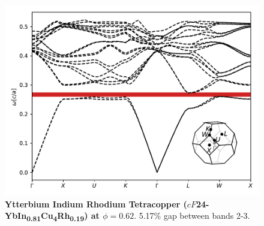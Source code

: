 \documentclass[fleqn,amsmath,amssymb,superscriptaddress, reprint,prl]{revtex4-1}
\begin{document}
\begin{figure}
\includegraphics[width=0.9\linewidth]{workspace/4280fc582e0e1774e4faa8a63dd87473/images/r=26.pdf}
	\caption{\textbf{Ytterbium Indium Rhodium Tetracopper ($cF$24-YbIn\textsubscript{0}\textsubscript{.}\textsubscript{8}\textsubscript{1}Cu\textsubscript{4}Rh\textsubscript{0}\textsubscript{.}\textsubscript{1}\textsubscript{9}) at $\phi=0.62$}. 5.17\% gap between bands 2-3.}
\end{figure}
\end{document}
